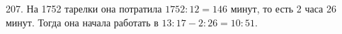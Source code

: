 207. На 1752 тарелки она потратила $1752:12=146$ минут, то есть 2 часа 26 минут. Тогда она начала работать в  $13:17-2:26=10:51.$\\

